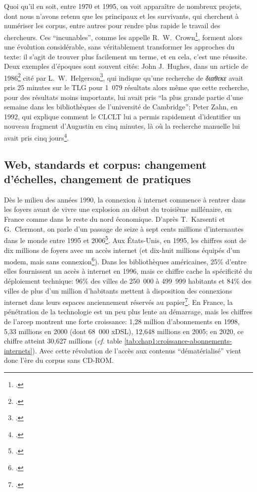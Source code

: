 Quoi qu'il en soit, entre 1970 et 1995, on voit apparaître de nombreux projets, dont nous n'avons retenu que les principaux et les survivants, qui cherchent à numériser les corpus, entre autres pour rendre plus rapide le travail des chercheurs. Ces \enquote{incunables}, comme les appelle R.~W.~Crown\footcite[p.~107]{crown_comparing_2000}, forment alors une évolution considérable, sans véritablement transformer les approches du texte: il s'agit de trouver plus facilement un terme, et en cela, c'est une réussite. Deux exemples d'époques sont souvent cités: John J.~Hughes, dans un article de 1986\footcite{hughes_ibycus_1986} cité par L.~W.~Helgerson\footcite{helgerson_cd-rom_1988}, qui indique qu'une recherche de \textit{\textgreek{διαθεκε}} avait pris 25 minutes sur le TLG pour 1~079 résultats alors même que cette recherche, pour des résultats moins importants, lui avait pris \enquote{la plus grande partie d'une semaine dans les bibliothèques de l'université de Cambridge}; Peter Zahn, en 1992, qui explique comment le CLCLT lui a permis rapidement d'identifier un nouveau fragment d'Augustin en cinq minutes, là où la recherche manuelle lui avait pris cinq jours\footcite[p. 427]{zahn_kirchenvater-texte_1992}.

\subsection{Web, standards et corpus: changement d'échelles, changement de pratiques}

Dès le milieu des années 1990, la connexion à internet commence à rentrer dans les foyers avant de vivre une explosion au début du troisième millénaire, en France comme dans le reste du nord économique. D'après T.~Karsenti et G.~Clermont, on parle d'un passage de seize à sept cents millions d'internautes dans le monde entre 1995 et 2006\footcite{karsenti_les_2006}. Aux États-Unis, en 1995, les chiffres sont de dix millions de foyers avec un accès internet (et dix-huit millions équipés d'un modem, mais sans connexion\footcite{nw_americans_1995}). Dans les bibliothèques américaines, 25\% d'entre elles fournissent un accès à internet en 1996, mais ce chiffre cache la spécificité du déploiement technique: 96\% des villes de 250~000 à 499~999 habitants et 84\% des villes de plus d'un million d'habitants mettent à disposition des connexions internet dans leurs espaces anciennement réservés au papier\footcite{zumalt_internet_1998}. En France, la pénétration de la technologie est un peu plus lente au démarrage, mais les chiffres de l'\acrfull{arcep} montrent une forte croissance: 1,28 million d'abonnements en 1998, 5,33 millions en 2000 (dont 68~000 xDSL), 12,648 millions en 2005; en 2020, ce chiffre atteint 30,627 millions (\textit{cf.} table \ref{tab:chap1:croissance-abonnements-internets}). Avec cette révolution de l'accès aux contenus \enquote{dématérialisé} vient donc l'ère du corpus sans CD-ROM.

